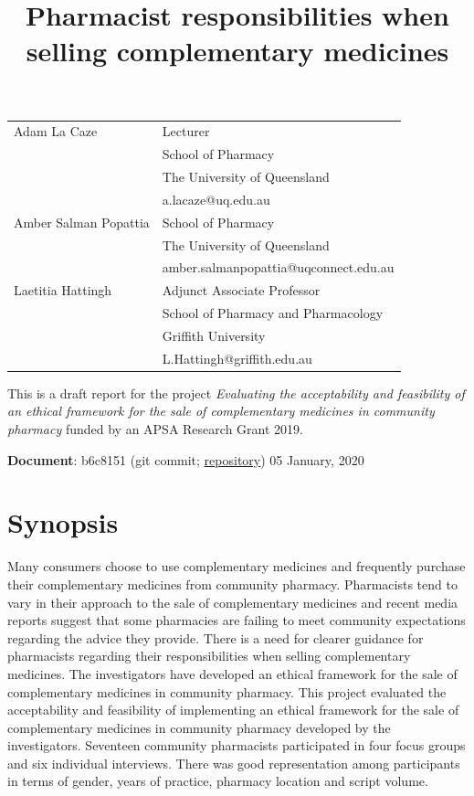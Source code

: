 \documentclass[11pt,a4paper]{article}
\title{Pharmacist responsibilities when selling complementary medicines}
\author{}
\date{}
\begin{document}
\maketitle

\begin{tabular}{ll} Adam La Caze & Lecturer\tabularnewline
& School of Pharmacy\tabularnewline
& The University of Queensland\tabularnewline
& a.lacaze@uq.edu.au\tabularnewline[10pt] Amber Salman Popattia & School of Pharmacy\tabularnewline
& The University of Queensland\tabularnewline
& amber.salmanpopattia@uqconnect.edu.au\tabularnewline[10pt] Laetitia Hattingh & Adjunct Associate Professor\tabularnewline
& School of Pharmacy and Pharmacology\tabularnewline
& Griffith University\tabularnewline
& L.Hattingh@griffith.edu.au\tabularnewline
\end{tabular}

\vfill
This is a draft report for the project \emph{Evaluating the
acceptability and feasibility of an ethical framework for the sale of
complementary medicines in community pharmacy} funded by an APSA
Research Grant 2019.

\bigskip
\textbf{Document}: b6c8151 (git commit;
\href{https://github.com/alacaze/cmethics_apsa}{repository}) \hfill 05
January, 2020

\newpage 

\tableofcontents

\newpage

\section{Synopsis}\label{synopsis}

Many consumers choose to use complementary medicines and frequently
purchase their complementary medicines from community pharmacy.
Pharmacists tend to vary in their approach to the sale of complementary
medicines and recent media reports suggest that some pharmacies are
failing to meet community expectations regarding the advice they
provide. There is a need for clearer guidance for pharmacists regarding
their responsibilities when selling complementary medicines. The
investigators have developed an ethical framework for the sale of
complementary medicines in community pharmacy. This project evaluated
the acceptability and feasibility of implementing an ethical framework
for the sale of complementary medicines in community pharmacy developed
by the investigators. Seventeen community pharmacists participated in
four focus groups and six individual interviews. There was good
representation among participants in terms of gender, years of practice,
pharmacy location and script volume.
\end{document}
